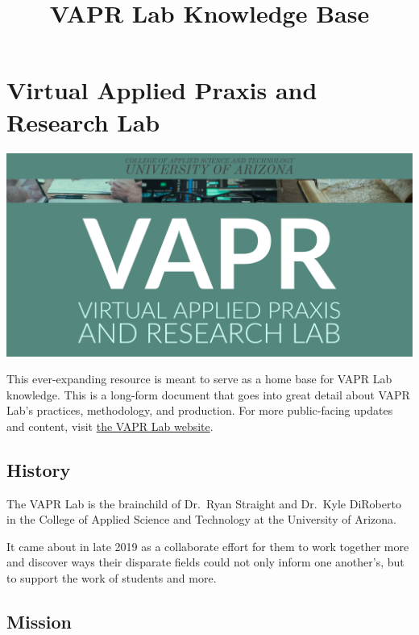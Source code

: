 \documentclass[12pt,]{memoir}
\title{VAPR Lab Knowledge Base}
\author{}
\date{}
\begin{document}
\maketitle

{
\hypersetup{linkcolor=black}
\setcounter{tocdepth}{1}
\tableofcontents
}
\listoftables
\listoffigures
\hypertarget{virtual-applied-praxis-and-research-lab}{%
\chapter*{Virtual Applied Praxis and Research Lab}\label{virtual-applied-praxis-and-research-lab}}

\includegraphics[width=30in]{images/VAPR-brand-banner}

This ever-expanding resource is meant to serve as a home base for VAPR Lab knowledge. This is a long-form document that goes into great detail about VAPR Lab's practices, methodology, and production. For more public-facing updates and content, visit \href{https://VAPR-Lab.github.io/website}{the VAPR Lab website}.

\hypertarget{history}{%
\section*{History}\label{history}}

The VAPR Lab is the brainchild of Dr.~Ryan Straight and Dr.~Kyle DiRoberto in the College of Applied Science and Technology at the University of Arizona.

It came about in late 2019 as a collaborate effort for them to work together more and discover ways their disparate fields could not only inform one another's, but to support the work of students and more.

\hypertarget{mission}{%
\section*{Mission}\label{mission}}
\end{document}
